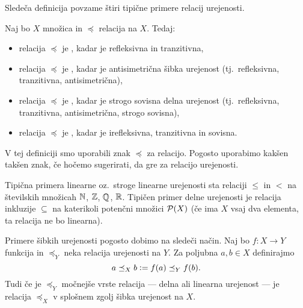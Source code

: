 		Sledeča definicija povzame štiri tipične primere relacij urejenosti.
		
		\begin{definicija}
			Naj bo $X$ množica in $\preceq$ relacija na $X$. Tedaj:
			\begin{itemize}
				\item
					relacija $\preceq$ je , kadar je refleksivna in tranzitivna,
				\item
					relacija $\preceq$ je , kadar je antisimetrična šibka urejenost (tj.~refleksivna, tranzitivna, antisimetrična),
				\item
					relacija $\preceq$ je , kadar je strogo sovisna delna urejenost (tj.~refleksivna, tranzitivna, antisimetrična, strogo sovisna),
				\item
					relacija $\preceq$ je , kadar je irefleksivna, tranzitivna in sovisna.
			\end{itemize}
		\end{definicija}
		
		V tej definiciji smo uporabili znak $\preceq$ za relacijo. Pogosto uporabimo kakšen takšen znak, če hočemo sugerirati, da gre za relacijo urejenosti.
		
		Tipična primera linearne oz.~stroge linearne urejenosti sta relaciji $\leq$ in $<$ na številskih množicah $\mathbb{N}$, $\mathbb{Z}$, $\mathbb{Q}$, $\mathbb{R}$. Tipičen primer delne urejenosti je relacija inkluzije $\subseteq$ na katerikoli potenčni množici $\mathcal{P}(X)$ (če ima $X$ vsaj dva elementa, ta relacija ne bo linearna).
		
		Primere šibkih urejenosti pogosto dobimo na sledeči način. Naj bo $f\colon X \to Y$ funkcija in $\preceq_Y$ neka relacija urejenosti na $Y$. Za poljubna $a, b \in X$ definirajmo
		\[a \preceq_X b \mathrel{\mathop:}= f(a) \preceq_Y f(b).\]
		Tudi če je $\preceq_Y$ močnejše vrste relacija --- delna ali linearna urejenost --- je relacija $\preceq_X$ v splošnem zgolj šibka urejenost na $X$.
		
		
		
		
		
